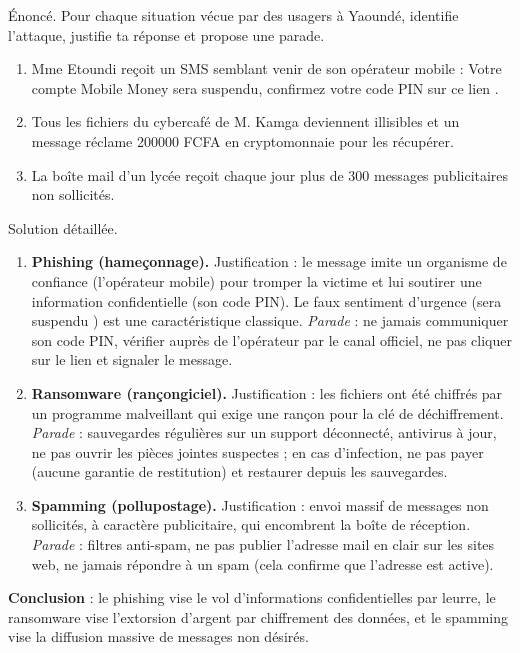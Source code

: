 \documentclass[11pt]{article}
\begin{document}
\begin{exoresolu}
Énoncé. Pour chaque situation vécue par des usagers à Yaoundé, identifie l'attaque, justifie ta réponse et propose une parade.
\begin{enumerate}
  \item[a)] Mme Etoundi reçoit un SMS semblant venir de son opérateur mobile : \og Votre compte Mobile Money sera suspendu, confirmez votre code PIN sur ce lien \fg.
  \item[b)] Tous les fichiers du cybercafé de M. Kamga deviennent illisibles et un message réclame \num{200000} FCFA en cryptomonnaie pour les récupérer.
  \item[c)] La boîte mail d'un lycée reçoit chaque jour plus de 300 messages publicitaires non sollicités.
\end{enumerate}
\tcblower
Solution détaillée.
\begin{enumerate}
  \item[a)] \textbf{Phishing (hameçonnage).} Justification : le message imite un organisme de confiance (l'opérateur mobile) pour tromper la victime et lui soutirer une information confidentielle (son code PIN). Le faux sentiment d'urgence (\og sera suspendu \fg) est une caractéristique classique. \emph{Parade} : ne jamais communiquer son code PIN, vérifier auprès de l'opérateur par le canal officiel, ne pas cliquer sur le lien et signaler le message.
  \item[b)] \textbf{Ransomware (rançongiciel).} Justification : les fichiers ont été chiffrés par un programme malveillant qui exige une rançon pour la clé de déchiffrement. \emph{Parade} : sauvegardes régulières sur un support déconnecté, antivirus à jour, ne pas ouvrir les pièces jointes suspectes ; en cas d'infection, ne pas payer (aucune garantie de restitution) et restaurer depuis les sauvegardes.
  \item[c)] \textbf{Spamming (pollupostage).} Justification : envoi massif de messages non sollicités, à caractère publicitaire, qui encombrent la boîte de réception. \emph{Parade} : filtres anti-spam, ne pas publier l'adresse mail en clair sur les sites web, ne jamais répondre à un spam (cela confirme que l'adresse est active).
\end{enumerate}
\textbf{Conclusion} : le phishing vise le vol d'informations confidentielles par leurre, le ransomware vise l'extorsion d'argent par chiffrement des données, et le spamming vise la diffusion massive de messages non désirés.
\end{exoresolu}
\end{document}
